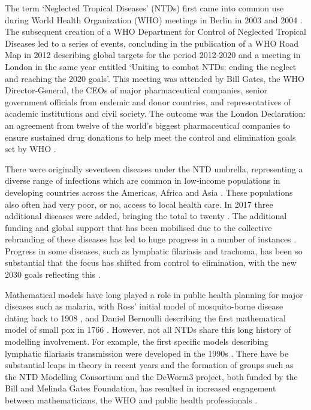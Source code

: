 The term `Neglected Tropical Diseases' (NTDs) first came into common use during World Health Organization (WHO) meetings in Berlin in 2003 and 2004 \cite{WHO_NTD}. The subsequent creation of a WHO Department for Control of Neglected Tropical Diseases led to a series of events, concluding in the publication of a WHO Road Map in 2012 describing global targets for the period 2012-2020 \cite{Roadmap} and a meeting in London in the same year entitled `Uniting to combat NTDs: ending the neglect and reaching the 2020 goals'. This meeting was attended by Bill Gates, the WHO Director-General, the CEOs of major pharmaceutical companies, senior government officials from endemic and donor countries, and representatives of academic institutions and civil society. The outcome was the London Declaration: an agreement from twelve of the world’s biggest pharmaceutical companies to ensure sustained drug donations to help meet the control and elimination goals set by WHO \cite{Allen2012}. 

There were originally seventeen diseases under the NTD umbrella, representing a diverse range of infections which are common in low-income populations in developing countries across the Americas, Africa and Asia \cite{Roadmap}. These populations also often had very poor, or no, access to local health care. In 2017 three additional diseases were added, bringing the total to twenty \cite{WHO_NTD}. The additional funding and global support that has been mobilised due to the collective rebranding of these diseases has led to huge progress in a number of instances \cite{rebollo2015,Njenga2011,Minetti2019}. Progress in some diseases, such as lymphatic filariasis and trachoma, has been so substantial that the focus has shifted from control to elimination, with the new 2030 goals reflecting this \cite{WHO2017_GPELF,NTDMC2019}.

Mathematical models have long played a role in public health planning for major diseases such as malaria, with Ross' initial model of mosquito-borne disease dating back to 1908 \cite{Ross1908}, and Daniel Bernoulli describing the first mathematical model of small pox in 1766 \cite{Dietz2000bernoulli}. However, not all NTDs share this long history of modelling involvement. For example, the first specific models describing lymphatic filariasis transmission were developed in the 1990s \cite{Rochet1990,Plaisier1998}. There have be substantial leaps in theory in recent years and the formation of groups such as the NTD Modelling Consortium and the DeWorm3 project, both funded by the Bill and Melinda Gates Foundation, has resulted in increased engagement between mathematicians, the WHO and public health professionals \cite{NTDMC2019}. 

